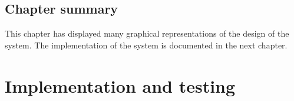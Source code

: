 \documentclass[12pt,a4paper]{article}
\newcommand\tab[1][.7cm]{\hspace*{#1}}
\begin{document}
\begin{comment}
\subsection{Flow Charts}
	A flow chart is a diagram used to represent the process flow of an algorithm, problem or some transaction
within a business. Therefore a flow chart (Figure \ref{fig:flowchart}) was used to graphically represent the process
flow of an order.
\begin{figure}[H]
		\centering
		\texttt{[image: /home/basedul/Documents/Report-writing-using-latex/ResturentManagementSystemReport/flowchart.png]}
		\caption{Flow chart to show the flow of events of an order..}
		\label{fig:flowchart} 
\end{figure}
\end{comment}

\subsection{Chapter summary}
	\tab This chapter has displayed many graphical representations of the design of the system. The implementation of the system is documented in the next chapter.
\newpage
\section{Implementation and testing}
\end{document}
